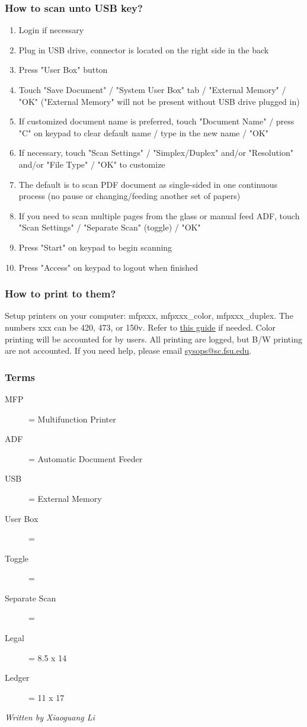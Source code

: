 \documentclass[12pt,a4paper]{article}
\begin{document}
\subsubsection*{How to scan unto USB key?}
\begin{enumerate}
    \item Login if necessary
    \item Plug in USB drive, connector is located on the right side in the back
    \item Press "User Box" button
    \item Touch "Save Document" / "System User Box" tab / "External Memory" / "OK" ("External Memory" will not be present without USB drive plugged in)
    \item If customized document name is preferred, touch "Document Name" / press "C" on keypad to clear default name / type in the new name / "OK"
    \item If necessary, touch "Scan Settings" / "Simplex/Duplex" and/or "Resolution" and/or "File Type" / "OK" to customize
    \item The default is to scan PDF document as single-sided in one continuous process (no pause or changing/feeding another set of papers)
    \item If you need to scan multiple pages from the glass or manual feed ADF, touch "Scan Settings" / "Separate Scan" (toggle) / "OK"
    \item Press "Start" on keypad to begin scanning
    \item Press "Access" on keypad to logout when finished
\end{enumerate}
\subsubsection*{How to print to them?}
Setup printers on your computer: mfpxxx, mfpxxx\_color, mfpxxx\_duplex. The numbers xxx can be 420, 473, or 150v. Refer to \href{https://www.sc.fsu.edu/computing/tech-docs/206-network-printer-setup}{this guide} if needed.
Color printing will be accounted for by users. All printing are logged, but B/W printing are not accounted.
If you need help, please email \href{mailto:sysops@sc.fsu.edu}{sysops@sc.fsu.edu}.
\subsubsection*{Terms}
\begin{description}
    \item[MFP] = Multifunction Printer
    \item[ADF] = Automatic Document Feeder
    \item[USB] = External Memory
    \item[User Box] = 
    \item[Toggle] = 
    \item[Separate Scan] = 
    \item[Legal] = 8.5 x 14
    \item[Ledger] = 11 x 17
\end{description}
\hfill \textit{Written by Xiaoguang Li}
\end{document}
